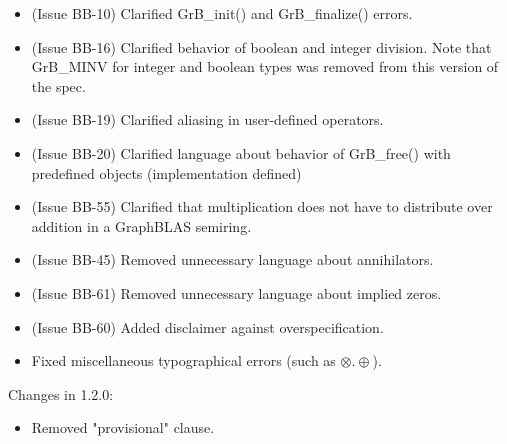 \begin{itemize}
\item (Issue BB-10) Clarified {\sf GrB\_init()} and {\sf GrB\_finalize()} errors.
\item (Issue BB-16) Clarified behavior of boolean and integer division. {\color{red} Note that {\sf GrB\_MINV} for integer and boolean types was removed from this version of the spec.}
\item (Issue BB-19) Clarified aliasing in user-defined operators.
\item (Issue BB-20) Clarified language about behavior of {\sf GrB\_free()} with predefined objects (implementation defined)
\item (Issue BB-55) Clarified that multiplication does not have to distribute over addition in a GraphBLAS semiring.
\item (Issue BB-45) Removed unnecessary language about annihilators.
\item (Issue BB-61) Removed unnecessary language about implied zeros.
\item (Issue BB-60) Added disclaimer against overspecification.
\item Fixed miscellaneous typographical errors (such as $\otimes.\oplus$).
\end{itemize}


Changes in 1.2.0:
\begin{itemize}
\item Removed "provisional" clause.
\end{itemize}



